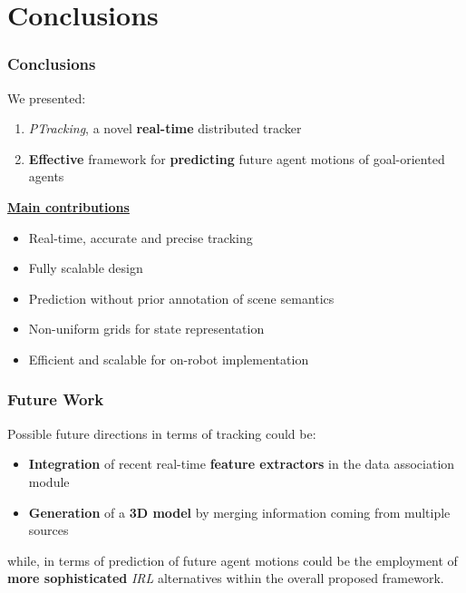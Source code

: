 \section{Conclusions}

\begin{frame}
	\frametitle{Conclusions}
	
	\Large
	
	\vspace{0.3cm}
	
	We presented:
	
	\begin{enumerate}
		\item \emph{PTracking}, a novel \textbf{real-time} distributed tracker
		\item \textbf{Effective} framework for \textbf{predicting} future agent motions of
			  goal-oriented agents
	\end{enumerate}
	
	\vspace{0.2cm}
	
	\underline{\textbf{Main contributions}}
	
	\begin{itemize}
		\item Real-time, accurate and precise tracking
		\item Fully scalable design
		\item Prediction without prior annotation of scene semantics
		\item Non-uniform grids for state representation
		\item Efficient and scalable for on-robot implementation
	\end{itemize}
\end{frame}

\begin{frame}
	\frametitle{Future Work}
	
	\Large
	
	Possible future directions in terms of tracking could be:
	\begin{itemize}
		\item \textbf{Integration} of recent real-time \textbf{feature extractors} in the data
			  association module
		\item \textbf{Generation} of a \textbf{3D model} by merging information coming from multiple
			  sources
	\end{itemize}
	
	while, in terms of prediction of future agent motions could be the employment of \textbf{more
	sophisticated} \emph{IRL} alternatives within the overall proposed framework.\\
\end{frame}

